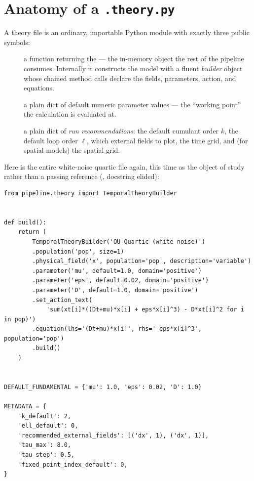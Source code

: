 \section{Anatomy of a \texttt{.theory.py}}

A theory file is an ordinary, importable Python module with exactly three public
symbols:

\begin{description}
  \item[] a function returning the  --- the
        in-memory object the rest of the pipeline consumes. Internally it
        constructs the model with a fluent \emph{builder} object whose chained
        method calls declare the fields, parameters, action, and equations.
  \item[] a plain dict of default numeric parameter
        values --- the ``working point'' the calculation is evaluated at.
  \item[] a plain dict of \emph{run recommendations}: the default
        cumulant order $k$, the default loop order $\ell$, which external fields
        to plot, the time grid, and (for spatial models) the spatial grid.
\end{description}

Here is the entire white-noise quartic file again, this time as the object of
study rather than a passing reference (,
docstring elided):

\begin{lstlisting}
from pipeline.theory import TemporalTheoryBuilder


def build():
    return (
        TemporalTheoryBuilder('OU Quartic (white noise)')
        .population('pop', size=1)
        .physical_field('x', population='pop', description='variable')
        .parameter('mu', default=1.0, domain='positive')
        .parameter('eps', default=0.02, domain='positive')
        .parameter('D', default=1.0, domain='positive')
        .set_action_text(
            'sum(xt[i]*((Dt+mu)*x[i] + eps*x[i]^3) - D*xt[i]^2 for i in pop)')
        .equation(lhs='(Dt+mu)*x[i]', rhs='-eps*x[i]^3', population='pop')
        .build()
    )


DEFAULT_FUNDAMENTAL = {'mu': 1.0, 'eps': 0.02, 'D': 1.0}

METADATA = {
    'k_default': 2,
    'ell_default': 0,
    'recommended_external_fields': [('dx', 1), ('dx', 1)],
    'tau_max': 8.0,
    'tau_step': 0.5,
    'fixed_point_index_default': 0,
}
\end{lstlisting}


